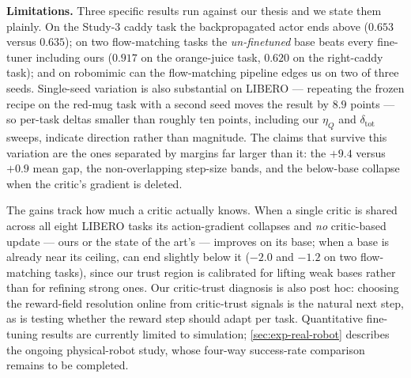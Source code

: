 \textbf{Limitations.}
\label{sec:limitations}
Three specific results run against our thesis and we state them
plainly. On the Study-3 caddy task the backpropagated actor ends above \method{}
($0.653$ versus $0.635$); on two flow-matching tasks the
\emph{un-finetuned} base beats every fine-tuner including ours ($0.917$
on the orange-juice task, $0.620$ on the right-caddy task); and on robomimic can the flow-matching pipeline
edges us on two of three seeds. Single-seed variation is also
substantial on LIBERO --- repeating the frozen recipe on the red-mug task with a
second seed moves the result by $8.9$ points --- so per-task deltas
smaller than roughly ten points, including our $\eta_Q$ and
$\delta_{\mathrm{tot}}$ sweeps, indicate direction rather than magnitude.
The claims that survive this variation are the ones separated by margins
far larger than it: the $+9.4$ versus $+0.9$ mean gap, the
non-overlapping step-size bands, and the below-base collapse when the
critic's gradient is deleted.

The gains track how much a critic actually knows.
When a single critic is shared across all eight LIBERO tasks its
action-gradient collapses and \emph{no} critic-based update --- ours or the
state of the art's --- improves on its base; when a base is already near its
ceiling, \method{} can end slightly below it ($-2.0$ and $-1.2$ on two
flow-matching tasks), since our trust region is calibrated for lifting weak
bases rather than for refining strong ones. Our critic-trust diagnosis is
also post hoc: choosing the reward-field resolution online from critic-trust
signals is the natural next step, as is testing whether the reward step
should adapt per task. Quantitative fine-tuning results are currently limited
to simulation; \cref{sec:exp-real-robot} describes the ongoing physical-robot
study, whose four-way success-rate comparison remains to be completed.

